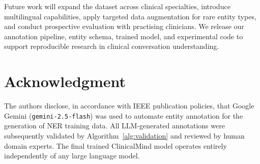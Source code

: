 \documentclass[conference]{IEEEtran}
\begin{document}
Future work will expand the dataset across clinical specialties, introduce
multilingual capabilities, apply targeted data augmentation for rare entity
types, and conduct prospective evaluation with practising clinicians. We
release our annotation pipeline, entity schema, trained model, and experimental
code to support reproducible research in clinical conversation understanding.

\section*{Acknowledgment}

The authors disclose, in accordance with IEEE publication policies, that
Google Gemini (\texttt{gemini-2.5-flash}) was used to automate entity
annotation for the generation of NER training data. All LLM-generated
annotations were subsequently validated by Algorithm~\ref{alg:validation}
and reviewed by human domain experts. The final trained ClinicalMind model
operates entirely independently of any large language model.
\end{document}
